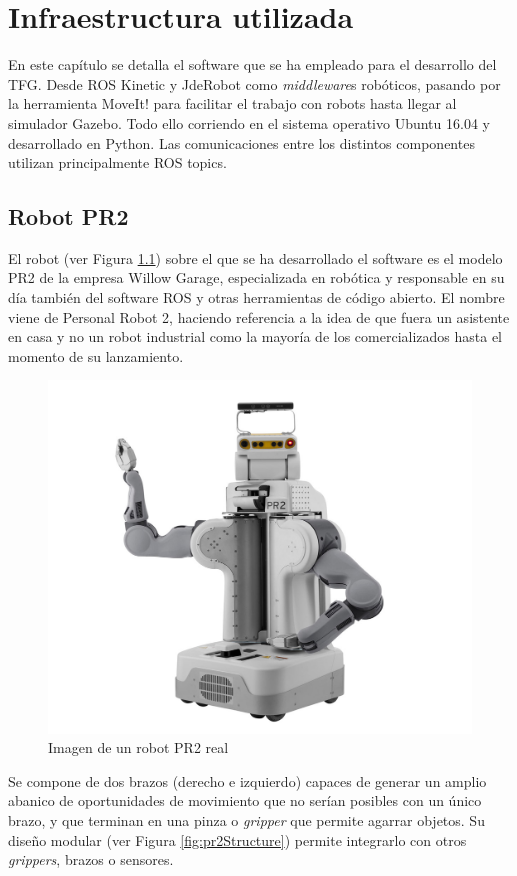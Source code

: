 \documentclass[12pt,spanish,chapterprefix, numbers=noenddot]{book}
\numberwithin{equation}{section}
\numberwithin{figure}{section}
\begin{document}
\chapter{Infraestructura utilizada}
En este capítulo se detalla el software que se ha empleado para el desarrollo del TFG. Desde ROS Kinetic y JdeRobot como \textit{middleware}s robóticos, pasando por la herramienta MoveIt! para facilitar el trabajo con robots hasta llegar al simulador Gazebo. Todo ello corriendo en el sistema operativo Ubuntu 16.04 y desarrollado en Python.  Las comunicaciones entre los distintos componentes utilizan principalmente ROS topics. 

\section{Robot PR2}
El robot (ver Figura \ref{fig:pr2}) sobre el que se ha desarrollado el software es el modelo PR2 \cite{pr2} de la empresa Willow Garage, especializada en robótica y responsable en su día también del software ROS y otras herramientas de código abierto. El nombre viene de Personal Robot 2, haciendo referencia a la idea de que fuera un asistente en casa y no un robot industrial como la mayoría de los comercializados hasta el momento de su lanzamiento. 

\begin{figure}[hbt!]
\centering
\includegraphics[width=12cm]{Figs/PR2_image.jpg}
\par
\caption{\label{fig:pr2}Imagen de un robot PR2 real}
\end{figure}

Se compone de dos brazos (derecho e izquierdo) capaces de generar un amplio abanico de oportunidades de movimiento que no serían posibles con un único brazo, y que terminan en una pinza o \textit{gripper} que permite agarrar objetos.
Su diseño modular (ver Figura \ref{fig:pr2Structure}) permite integrarlo con otros \textit{grippers}, brazos o sensores.
\end{document}
